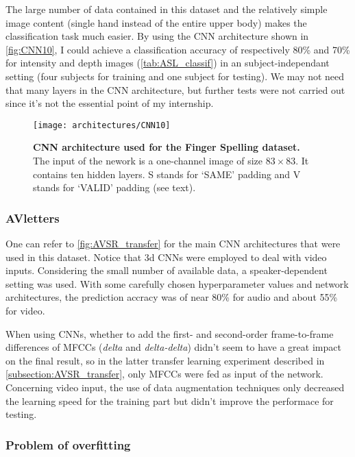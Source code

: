 The large number of data contained in this dataset and the relatively
simple image content (single hand instead of the entire upper body)
makes the classification task much easier. By using the CNN architecture
shown in \autoref{fig:CNN10}, I could achieve a classification accuracy
of respectively 80\% and 70\% for intensity and depth images
(\autoref{tab:ASL_classif})
in an subject-independant setting (four subjects for training and one
subject for testing). We may not need that many layers in the CNN
architecture, but further tests were not carried out since it's not
the essential point of my internship.

\begin{figure}[H]
  \centering
  \texttt{[image: architectures/CNN10]}
  \caption{%
    \textbf{CNN architecture used for the Finger Spelling  dataset.}
      \\[0.1em]
    The input of the nework is a one-channel image of size $83 \times 83$.
      It contains ten hidden layers. S stands for `SAME' padding
      and V stands for `VALID' padding (see text).}
  \label{fig:CNN10}
\end{figure}

\subsubsection{AVletters}

One can refer to \autoref{fig:AVSR_transfer} for the main CNN architectures
that were used in this dataset. 
Notice that 3d CNNs were employed to deal with video inputs.
Considering the small number of available data, a speaker-dependent
setting was used.
With some carefully chosen hyperparameter values and network architectures,
the prediction accracy was of near 80\% for audio and about 55\% for video.

When using CNNs, whether to add the first- and second-order frame-to-frame
differences of MFCCs (\textit{delta} and \textit{delta-delta}) didn't seem
to have a great impact on the final result, so in the latter transfer
learning experiment described in \ref{subsection:AVSR_transfer}, only
MFCCs were fed as input of the network.
Concerning video input, the use of data augmentation techniques only
decreased the learning speed for the training part but didn't improve
the performace for testing.

\subsubsection{Problem of overfitting}

